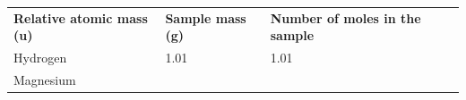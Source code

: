 \begin{enumerate}[noitemsep, label=\textbf{\arabic*}. ]
{{\begin{center}
\begin{xtabular}[t]{|l|l|l|l|}
        \textbf{Relative atomic mass (u)} &
    
    
        \textbf{Sample mass (g)} &
    
    
        \textbf{Number of moles in the sample}%
     \tabularnewline{}
    
    
        Hydrogen &
    
    
        1.01 &
    
    
        1.01 &
    
    
     \tabularnewline{}
    
    
        Magnesium &
    

\end{xtabular}
\end{center}}}
\end{enumerate}
